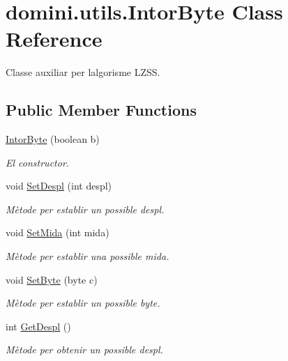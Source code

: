 \hypertarget{classdomini_1_1utils_1_1IntorByte}{}\section{domini.\+utils.\+Intor\+Byte Class Reference}
\label{classdomini_1_1utils_1_1IntorByte}


Classe auxiliar per l\textquotesingle{}algorisme L\+Z\+SS.  


\subsection*{Public Member Functions}
\begin{DoxyCompactItemize}
\item 
\hyperlink{classdomini_1_1utils_1_1IntorByte_ac2bae675cf6c4d8880acedeefaf24060}{Intor\+Byte} (boolean b)
\begin{DoxyCompactList}\small\item\em El constructor. \end{DoxyCompactList}\item 
void \hyperlink{classdomini_1_1utils_1_1IntorByte_a01c26f8a3a94b2bc31fda2f5989fca00}{Set\+Despl} (int despl)
\begin{DoxyCompactList}\small\item\em Mètode per establir un possible despl. \end{DoxyCompactList}\item 
void \hyperlink{classdomini_1_1utils_1_1IntorByte_a2371fca6d26baf4098466dbb3089052d}{Set\+Mida} (int mida)
\begin{DoxyCompactList}\small\item\em Mètode per establir una possible mida. \end{DoxyCompactList}\item 
void \hyperlink{classdomini_1_1utils_1_1IntorByte_a02677743722d43ce96904e03eb82f25b}{Set\+Byte} (byte c)
\begin{DoxyCompactList}\small\item\em Mètode per establir un possible byte. \end{DoxyCompactList}\item 
int \hyperlink{classdomini_1_1utils_1_1IntorByte_a5d99bc2397d586c3e3319eadf7f23e4d}{Get\+Despl} ()
\begin{DoxyCompactList}\small\item\em Mètode per obtenir un possible despl. \end{DoxyCompactList}\item 

\end{DoxyCompactItemize}
